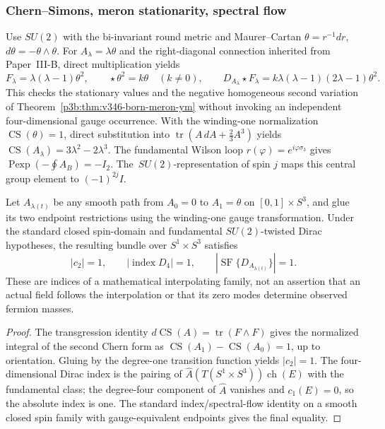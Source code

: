 \documentclass[11pt,a4paper]{article}
\begin{document}
\subsubsection{Chern--Simons, meron stationarity, spectral flow}
\label{p3g:sec:v346-meron-proof}
Use $SU(2)$ with the bi-invariant round metric and Maurer--Cartan
$\theta=r^{-1}dr$, $d\theta=-\theta\wedge\theta$.  For
$A_\lambda=\lambda\theta$ and the right-diagonal connection inherited
from Paper~III-B, direct multiplication yields
\[
 F_\lambda=\lambda(\lambda-1)\theta^2,
 \qquad \star\theta^2=k\theta
 \quad(k\ne0),\qquad
 D_{A_\lambda}\star F_\lambda
 =k\lambda(\lambda-1)(2\lambda-1)\theta^2.
\]
This checks the stationary values and the negative homogeneous second
variation of Theorem~\ref{p3b:thm:v346-born-meron-ym} without invoking an
independent four-dimensional gauge occurrence.  With the winding-one
normalization $\operatorname{CS}(\theta)=1$, direct substitution into
$\operatorname{tr}(A\,dA+\tfrac23A^3)$ yields
$\operatorname{CS}(A_\lambda)=3\lambda^2-2\lambda^3$.  The
fundamental Wilson loop $r(\varphi)=e^{i\varphi\sigma_3}$ gives
$\operatorname{Pexp}(-\oint A_B)=-I_2$.  The $\,SU(2)$-representation
of spin $j$ maps this central group element to $(-1)^{2j}I$.

\begin{proposition}
\label{p3g:prop:v346-connection-spectral-flow}
Let $A_{\lambda(t)}$ be any smooth path from $A_0=0$ to $A_1=\theta$
on $[0,1]\times S^3$, and glue its two endpoint restrictions using
the winding-one gauge transformation.  Under the standard closed
spin-domain and fundamental $SU(2)$-twisted Dirac hypotheses, the
resulting bundle over $S^1\times S^3$ satisfies
\[
 \boxed{|c_2|=1,\qquad |\operatorname{index}D_4|=1,
 \qquad |\operatorname{SF}\{D_{A_{\lambda(t)}}\}|=1.}
\]
These are indices of a mathematical interpolating family, not an
assertion that an actual field follows the interpolation or that its
zero modes determine observed fermion masses.
\end{proposition}
\begin{proof}
The transgression identity
$d\operatorname{CS}(A)=\operatorname{tr}(F\wedge F)$ gives the
normalized integral of the second Chern form as
$\operatorname{CS}(A_1)-\operatorname{CS}(A_0)=1$, up to orientation.
Gluing by the degree-one transition function yields $|c_2|=1$.
The four-dimensional Dirac index is the pairing of
$\widehat A(T(S^1\times S^3))\operatorname{ch}(E)$ with the
fundamental class; the degree-four component of $\widehat A$ vanishes
and $c_1(E)=0$, so the absolute index is one.  The standard
index/spectral-flow identity on a smooth closed spin family with
gauge-equivalent endpoints gives the final equality.
\end{proof}
\end{document}
